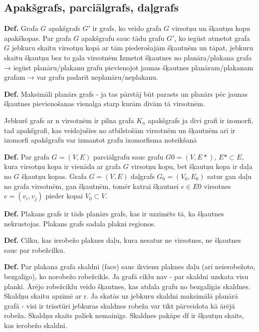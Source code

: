 \documentclass{article}
\begin{document}
\subsection{Apakšgrafs, parciālgrafs, daļgrafs}
\textbf{Def.}  Grafa $ G $ apakšgrafs $ G' $ ir grafs, ko veido grafa $ G $ virsotņu un šķautņu kopu apakškopas.  Par grafa $ G $ apakšgrafu sauc tādu grafu $ G' $, ko iegūst atmetot grafa $ G $ jebkuru skaitu virsotņu kopā ar tām piederošajām šķautnēm un tāpat, jebkuru skaitu šķautņu bez to gala virsotnēm
Izmetot šķautnes no planāra/plakana grafa → iegūst planāru/plakanu grafu pievienojot jaunas šķautnes planāram/plakanam grafam → var grafu padarīt neplanāru/neplakanu.

\textbf{Def.}  Maksimāli planārs grafs - ja tas pārstāj būt parasts un planārs pēc jaunas šķautnes pievienošanas vienalga starp kurām divām tā virsotnēm.

Jebkurš grafs ar n virsotnēm ir pilna grafa $K_n$ apakšgrafs ja divi grafi ir izomorfi, tad apakšgrafi, kas veidojušies no atbilstošām virsotnēm un šķautnēm arī ir izomorfi apakšgrafu var izmantot grafu izomorfisma noteikšanā

\textbf{Def.} Par grafa $G = (V,E)$ parciālgrafu sauc grafu $G 0 = (V , E *)$, $E* \subset E$, kura virsotņu kopa ir vienāda ar grafa $ G $ virsotņu kopu, bet šķautņu kopa ir daļa no $ G $ šķautņu kopas.  Grafa $G = (V,E)$ daļgrafs $G_0 = (V_0 , E_0 )$ satur gan daļu no grafa virsotnēm, gan šķautnēm, tomēr katrai šķautnei $e \in E 0$ virsotnes $e = (v_i , v_j )$ pieder kopai $V_0 ⊂ V$.

\textbf{Def.} Plakans grafs ir tāds planārs grafs, kas ir uzzīmēts tā, ka šķautnes nekrustojas.  Plakans grafs sadala plakni regionos.

\textbf{Def.}  Cilku, kas ierobežo plaknes daļu, kura nesatur ne virsotnes, ne šķautnes sauc par robežcilku.

\textbf{Def.} Par plakana grafa skaldni (face) sauc ikvienu plaknes daļu (arī neierobežoto, bezgalīgo), ko norobežo robežcikls.  Ja grafā ciklu nav - par skaldni uzskata visu planki.  Ārējo robežciklu veido šķautnes, kas atdala grafu no bezgalīgās skaldnes.  Skaldņu skaitu apzīmē ar r. Ja skatās uz jebkuru skaldni maksimālā planārā grafā - visi ir trīsstūri jebkuras skaldnes robeža var tikt pārveidota kā ārējā robeža. Skaldņu skaits paliek nemainīgs.  Skaldnes pakāpe df ir šķautņu skaits, kas ierobežo skaldni.
\end{document}
